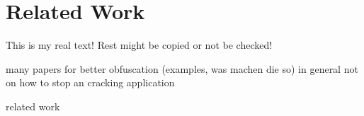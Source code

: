 \section{Related Work}\label{section:introduction-related}
This is my real text! Rest might be copied or not be checked!

many papers  for better obfuscation (examples, was machen die so) in general not on how to stop an cracking application 

related work
